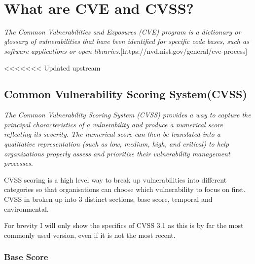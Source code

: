 \documentclass[11pt]{article}
\begin{document}
 \\

\section{What are CVE and CVSS?}

\textit{The Common Vulnerabilities and Exposures (CVE) program is a dictionary or glossary of
	vulnerabilities that have been identified for specific code bases, such as software applications or
	open libraries.}[https://nvd.nist.gov/general/cve-process]

<<<<<<< Updated upstream
\subsection{Common Vulnerability Scoring System(CVSS)}

\textit{The Common Vulnerability Scoring System (CVSS) provides a way to capture the principal characteristics of a
	vulnerability and produce a numerical score reflecting its severity. The numerical score can then be translated
	into a qualitative representation (such as low, medium, high, and critical) to help organizations properly
	assess and prioritize their vulnerability management
	processes.}

CVSS scoring is a high level way to break up vulnerabilities into different categories so that
organisations can choose which vulnerability to focus on first. CVSS in broken up into 3 distinct sections, base score,
temporal and environmental.

For brevity I will only show the specifics of CVSS 3.1 as this is by far the most commonly used version, even if it is
not the most recent.

\subsubsection*{Base Score}
\end{document}
